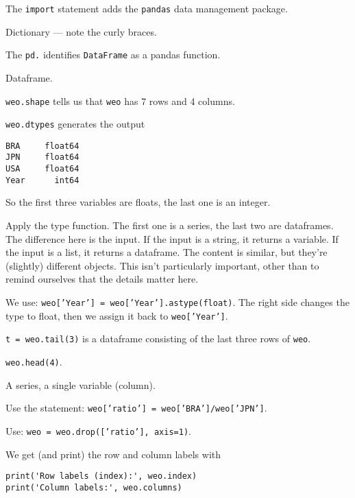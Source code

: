\documentclass[11pt]{exam}
\begin{document}
\begin{questions}
\begin{solution}
\begin{parts}
\item The {\tt import} statement adds the {\tt pandas} data management package.
\item Dictionary --- note the curly braces.
\item The {\tt pd.} identifies {\tt DataFrame} as a pandas function.
\item Dataframe.
\item {\tt weo.shape} tells us that {\tt weo} has 7 rows and 4 columns.
\item {\tt weo.dtypes} generates the output
\begin{verbatim}
BRA     float64
JPN     float64
USA     float64
Year      int64
\end{verbatim}
So the first three variables are floats, the last one is an integer.
\item Apply the type function.  The first one is a series, the last two are
dataframes.
The difference here is the input.  If the input is a string, it returns a variable.
If the input is a list, it returns a dataframe.  The content is similar, but they're
(slightly) different objects.
This isn't particularly important, other than to remind ourselves that
the details matter here.

\item We use:  {\tt weo['Year'] = weo['Year'].astype(float)}.
The right side changes the type to float, then we assign it back to {\tt weo['Year']}.

\item {\tt t = weo.tail(3)}
is a dataframe consisting of the last three rows of {\tt weo}.

\item {\tt  weo.head(4)}.

\item A series, a single variable (column).

\item Use the statement:  {\tt weo['ratio'] = weo['BRA']/weo['JPN']}.

\item Use: {\tt weo = weo.drop(['ratio'], axis=1)}.

\item We get (and print) the row and column labels with
\begin{verbatim}
print('Row labels (index):', weo.index)
print('Column labels:', weo.columns)
\end{verbatim}


\end{parts}
\end{solution}
\end{questions}
\end{document}
